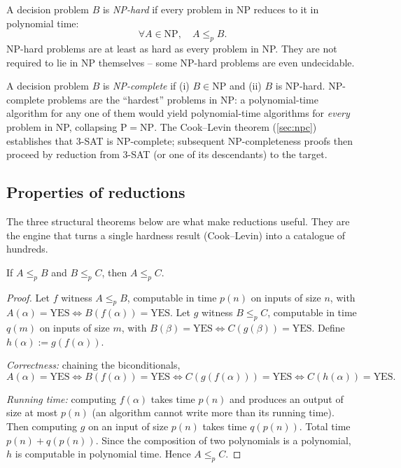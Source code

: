 \begin{definition}[NP-hard]
\label{def:np_hard}
A decision problem $B$ is \emph{NP-hard} if every problem in $\mathrm{NP}$ reduces to it in polynomial time:
\[
  \forall A \in \mathrm{NP},\quad A \le_p B.
\]
NP-hard problems are at least as hard as every problem in NP. They are not required to lie in NP themselves -- some NP-hard problems are even undecidable.
\end{definition}

\begin{definition}[NP-complete]
\label{def:np_complete}
A decision problem $B$ is \emph{NP-complete} if (i) $B \in \mathrm{NP}$ and (ii) $B$ is NP-hard. NP-complete problems are the ``hardest'' problems in NP: a polynomial-time algorithm for any one of them would yield polynomial-time algorithms for \emph{every} problem in NP, collapsing $\mathrm{P} = \mathrm{NP}$. The Cook--Levin theorem (\cref{sec:npc}) establishes that 3-SAT is NP-complete; subsequent NP-completeness proofs then proceed by reduction from 3-SAT (or one of its descendants) to the target.
\end{definition}

\subsection{Properties of reductions}

The three structural theorems below are what make reductions useful. They are the engine that turns a single hardness result (Cook--Levin) into a catalogue of hundreds.

\begin{theorem}[Transitivity of $\le_p$]
\label{thm:reduction_transitive}
If $A \le_p B$ and $B \le_p C$, then $A \le_p C$.
\end{theorem}

\begin{proof}
Let $f$ witness $A \le_p B$, computable in time $p(n)$ on inputs of size $n$, with $A(\alpha) = \text{YES} \iff B(f(\alpha)) = \text{YES}$. Let $g$ witness $B \le_p C$, computable in time $q(m)$ on inputs of size $m$, with $B(\beta) = \text{YES} \iff C(g(\beta)) = \text{YES}$. Define $h(\alpha) := g(f(\alpha))$.

\emph{Correctness:} chaining the biconditionals,
\[
  A(\alpha) = \text{YES} \iff B(f(\alpha)) = \text{YES} \iff C(g(f(\alpha))) = \text{YES} \iff C(h(\alpha)) = \text{YES}.
\]

\emph{Running time:} computing $f(\alpha)$ takes time $p(n)$ and produces an output of size at most $p(n)$ (an algorithm cannot write more than its running time). Then computing $g$ on an input of size $p(n)$ takes time $q(p(n))$. Total time $p(n) + q(p(n))$. Since the composition of two polynomials is a polynomial, $h$ is computable in polynomial time. Hence $A \le_p C$.
\end{proof}

